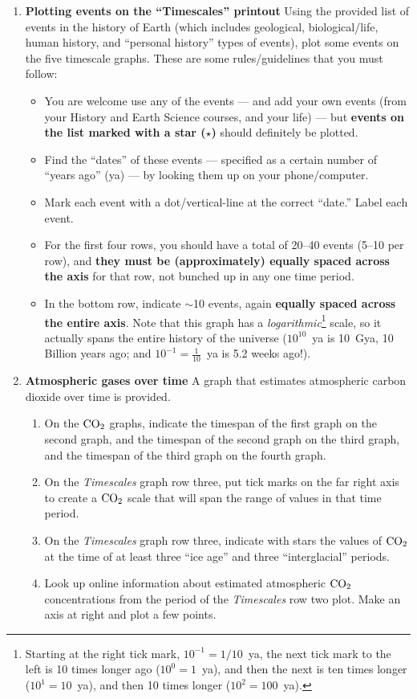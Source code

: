 \documentclass[12pt]{article}
\begin{document}
\begin{enumerate}
\item {\bf Plotting events on the ``Timescales'' printout} Using the provided list of events in the history of Earth (which includes geological, biological/life, human history, and ``personal history'' types of events), plot some events on the five timescale graphs. These are some rules/guidelines that you must follow:
	\begin{itemize} 
	\item You are welcome use any of the events --- and add your own events (from your History and Earth Science courses, and your life) --- but {\bf events on the list marked with a star ($\star$)} should definitely be plotted.
	\item Find the ``dates'' of these events --- specified as a certain number of ``years ago'' (ya) ---  by looking them up on your phone/computer.
	\item Mark each event with a dot/vertical-line at the correct ``date.'' Label each event.
	\item For the first four rows, you should have a total of 20--40 events (5--10 per row), and {\bf they must be (approximately) equally spaced across the axis} for that row, not bunched up in any one time period.
	\item In the bottom row, indicate $\sim$10 events, again {\bf equally spaced across the entire axis}. Note that this graph has a {\em logarithmic}\footnote{Starting at the right tick mark, $10^{-1} = 1/10$~ya, the next tick mark to the left is 10 times longer ago ($10^0 = 1$~ya), and then the next is ten times longer ($10^1 = 10$~ya), and then 10 times longer ($10^2 = 100$~ya). } scale, so it actually spans the entire history of the universe ($10^{10}$~ya is 10~Gya, 10 Billion years ago; and $10^{-1} = \frac{1}{10}$~ya is 5.2 weeks ago!).  
	\end{itemize}

\item {\bf Atmospheric gases over time} A graph that estimates atmospheric carbon dioxide over time is provided.  
	\begin{enumerate}
	\item On the ${\rm CO}_2$ graphs, indicate the timespan of the first graph on the second graph, and the timespan of the second graph on the third graph, and the timespan of the third graph on the fourth graph.
	\item On the {\em Timescales} graph row three, put tick marks on the far right axis to create a ${\rm CO}_2$ scale that will span the range of values in that time period.
	\item On the {\em Timescales} graph row three, indicate with stars the values of ${\rm CO}_2$ at the time of at least three ``ice age'' and three ``interglacial'' periods.
	\item Look up online information about estimated atmospheric ${\rm CO}_2$ concentrations from the period of the {\em Timescales} row two plot.  Make an axis at right and plot a few points.
	\end{enumerate}

\end{enumerate}
\end{document}
